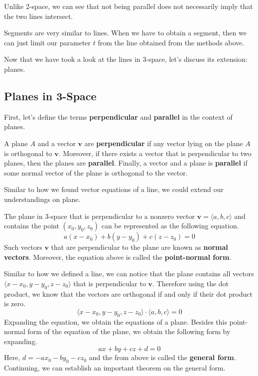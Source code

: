 \documentclass[../../../main.tex]{subfiles}
\begin{document}
Unlike 2-space, we can see that not being parallel does not
necessarily imply that the two lines intersect.

\begin{important}
Segments are very similar to lines. When we have to obtain a segment,
then we can just limit our parameter $t$ from the line obtained
from the methods above.
\end{important}

Now that we have took a look at the lines in 3-space, let's discuss
its extension: planes.

\subsection{Planes in 3-Space}

First, let's define the terms \textbf{perpendicular} and
\textbf{parallel} in the context of planes.

\begin{definition}{}{}
A plane $A$ and a vector $\mathbf{v}$ are \textbf{perpendicular}
if any vector lying on the plane $A$ is orthogonal to $\mathbf{v}$.
Moreover, if there exists a vector that is perpendicular to two
planes, then the planes are \textbf{parallel}. Finally, a vector
and a plane is \textbf{parallel} if some normal vector of the plane
is orthogonal to the vector.
\end{definition}

Similar to how we found vector equations of a line, we could
extend our understandings on plane.

\begin{important}{}{}
The plane in 3-space that is perpendicular to a nonzero vector
$\mathbf{v} = \langle a, b, c \rangle$ and contains the point
$(x_0, y_0, z_0)$ can be represented as the following equation.
\[
a(x - x_0) + b(y - y_0) + c(z - z_0) = 0
\]
Such vectors $\mathbf{v}$ that are perpendicular to the plane
are known as \textbf{normal vectors}. Moreover, the equation
above is called the \textbf{point-normal form}.
\end{important}

Similar to how we defined a line, we can notice that the plane
contains all vectors $\langle x - x_0, y - y_0, z - z_0 \rangle$
that is perpendicular to $\mathbf{v}$. Therefore using the dot
product, we know that the vectors are orthogonal if and only
if their dot product is zero.
\[
\langle x - x_0, y - y_0, z - z_0 \rangle \cdot
    \langle a, b, c \rangle
= 0
\]
Expanding the equation, we obtain the equations of a plane.
Besides this point-normal form of the equation of the plane,
we obtain the following form by expanding.
\[
ax + by + cz + d = 0
\]
Here, $d = -ax_0 - by_0 - cz_0$ and the from above is called
the \textbf{general form}. Continuing, we can establish an
important theorem on the general form.
\end{document}
